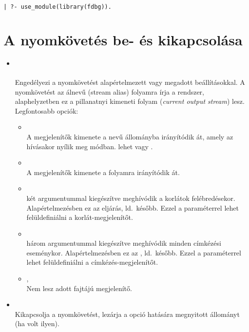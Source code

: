 \begin{verbatim}
| ?- use_module(library(fdbg)).
\end{verbatim}

\section{A nyomkövetés be- és kikapcsolása}

\begin{itemize}
\item {}\\ \\
Engedélyezi a nyomkövetést alapértelmezett vagy megadott beállításokkal. A
nyomkövetést az  álnevű (stream alias) folyamra írja a
rendszer, alaphelyzetben ez a pillanatnyi kimeneti folyam ({\em current
output stream}) lesz. Legfontosabb opciók:\\
\begin{itemize}
\item {}\\
  A megjelenítők kimenete a  nevű állományba irányítódik
  át, amely az  hívásakor nyílik meg  módban.
   lehet  vagy .
\item {}\\
  A megjelenítők kimenete a  folyamra irányítódik át.
\item {}\\
   két argumentummal kiegészítve meghívódik a korlátok
  felébredésekor. Alapértelmezésben ez az  eljárás, ld.~később.
  Ezzel a paraméterrel lehet felüldefiniálni a korlát-megjelenítőt.
\item {}\\
   három argumentummal kiegészítve meghívódik minden címkézési
  eseménykor. Alapértelmezésben ez az , ld.~később.
  Ezzel a paraméterrel lehet felüldefiniálni a címkézés-megjelenítőt.
\item {}, \\ 
  Nem lesz adott fajtájú megjelenítő.
\end{itemize}

\item {}\\
  Kikapcsolja a nyomkövetést, lezárja a  opció hatására megnyitott
  állományt (ha volt ilyen).
\end{itemize}


